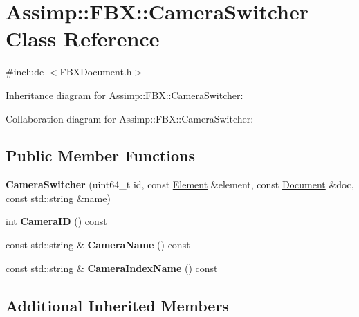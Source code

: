 \hypertarget{class_assimp_1_1_f_b_x_1_1_camera_switcher}{\section{Assimp\+:\+:F\+B\+X\+:\+:Camera\+Switcher Class Reference}
\label{class_assimp_1_1_f_b_x_1_1_camera_switcher}
}


{\ttfamily \#include $<$F\+B\+X\+Document.\+h$>$}



Inheritance diagram for Assimp\+:\+:F\+B\+X\+:\+:Camera\+Switcher\+:


Collaboration diagram for Assimp\+:\+:F\+B\+X\+:\+:Camera\+Switcher\+:
\subsection*{Public Member Functions}
\begin{DoxyCompactItemize}
\item 
\hypertarget{class_assimp_1_1_f_b_x_1_1_camera_switcher_a4e65715c78ba71af4988801dba560d79}{{\bfseries Camera\+Switcher} (uint64\+\_\+t id, const \hyperlink{class_assimp_1_1_f_b_x_1_1_element}{Element} \&element, const \hyperlink{class_assimp_1_1_f_b_x_1_1_document}{Document} \&doc, const std\+::string \&name)}\label{class_assimp_1_1_f_b_x_1_1_camera_switcher_a4e65715c78ba71af4988801dba560d79}

\item 
\hypertarget{class_assimp_1_1_f_b_x_1_1_camera_switcher_afe495f23be42178dc1ac97527cdc09ab}{int {\bfseries Camera\+I\+D} () const }\label{class_assimp_1_1_f_b_x_1_1_camera_switcher_afe495f23be42178dc1ac97527cdc09ab}

\item 
\hypertarget{class_assimp_1_1_f_b_x_1_1_camera_switcher_a3a9b9d7554bd2dc9fe76318af16116a9}{const std\+::string \& {\bfseries Camera\+Name} () const }\label{class_assimp_1_1_f_b_x_1_1_camera_switcher_a3a9b9d7554bd2dc9fe76318af16116a9}

\item 
\hypertarget{class_assimp_1_1_f_b_x_1_1_camera_switcher_a1cdfca26c6e0915a8912e1735cefb80d}{const std\+::string \& {\bfseries Camera\+Index\+Name} () const }\label{class_assimp_1_1_f_b_x_1_1_camera_switcher_a1cdfca26c6e0915a8912e1735cefb80d}

\end{DoxyCompactItemize}
\subsection*{Additional Inherited Members}


